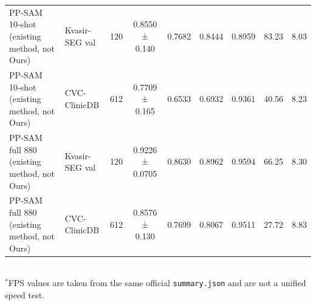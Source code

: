 \begin{table}[ht]
\begin{tabular}{llccccccc}
PP-SAM 10-shot (existing method, not Ours) & Kvasir-SEG val & 120 & 0.8550 ± 0.140 & 0.7682 & 0.8444 & 0.8959 & 83.23 & 8.03 \\
PP-SAM 10-shot (existing method, not Ours) & CVC-ClinicDB & 612 & 0.7709 ± 0.165 & 0.6533 & 0.6932 & 0.9361 & 40.56 & 8.23 \\
PP-SAM full 880 (existing method, not Ours) & Kvasir-SEG val & 120 & 0.9226 ± 0.0705 & 0.8630 & 0.8962 & 0.9594 & 66.25 & 8.30 \\
PP-SAM full 880 (existing method, not Ours) & CVC-ClinicDB & 612 & 0.8576 ± 0.130 & 0.7699 & 0.8067 & 0.9511 & 27.72 & 8.83 \\
\bottomrule
\end{tabular}
\\[0.4em]{\small $^*$FPS values are taken from the same official \texttt{summary.json} and are not a unified speed test.}
\end{table}
